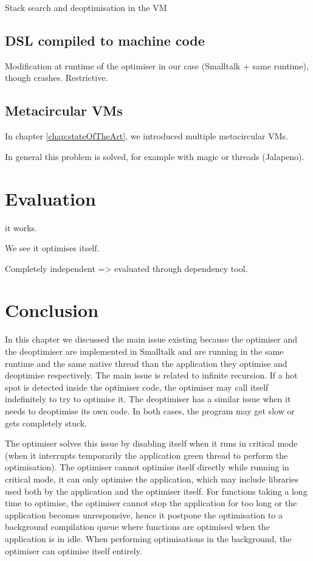 \documentclass[a4paper,12pt,twoside]{../includes/ThesisStyle}
\begin{document}
Stack search and deoptimisation in the VM

\subsection{DSL compiled to machine code}

Modification at runtime of the optimiser in our case (Smalltalk + same runtime), though crashes.
Restrictive.

\subsection{Metacircular VMs}

In chapter \ref{chap:stateOfTheArt}, we introduced multiple metacircular VMs. 

In general this problem is solved, for example with magic or threads (Jalapeno).



\section{Evaluation}

it works.

We see it optimises itself.

Completely independent => evaluated through dependency tool.


\section{Conclusion}

In this chapter we discussed the main issue existing because the optimiser and the deoptimiser are implemented in Smalltalk and are running in the same runtime and the same native thread than the application they optimise and deoptimise respectively. The main issue is related to infinite recursion. If a hot spot is detected inside the optimiser code, the optimiser may call itself indefinitely to try to optimise it. The deoptimiser has a similar issue when it needs to deoptimise its own code. In both cases, the program may get slow or gets completely stuck.

The optimiser solves this issue by disabling itself when it runs in critical mode (when it interrupts temporarily the application green thread to perform the optimisation). The optimiser cannot optimise itself directly while running in critical mode, it can only optimise the  application, which may include libraries used both by the application and the optimiser itself. For functions taking a long time to optimise, the optimiser cannot stop the application for too long or the application becomes unresponsive, hence it postpone the optimisation to a background compilation queue where functions are optimised when the application is in idle. When performing optimisations in the background, the optimiser can optimise itself entirely.
\end{document}
